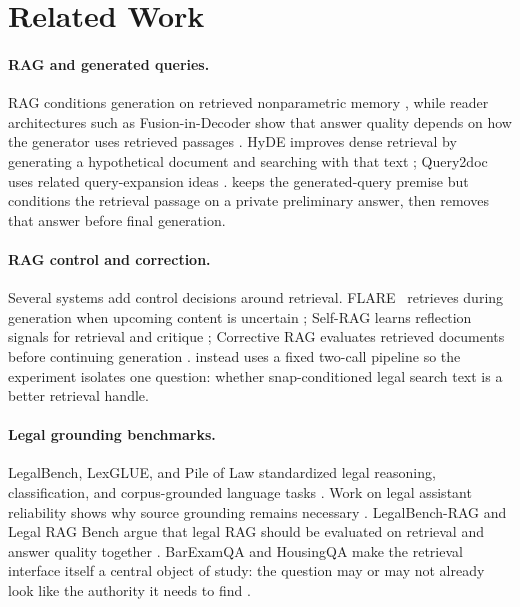 \section{Related Work}\label{sec:related_work}

\paragraph{RAG and generated queries.}
RAG conditions generation on retrieved nonparametric memory
\citep{lewis2020rag}, while reader architectures such as Fusion-in-Decoder
show that answer quality depends on how the generator uses retrieved passages
\citep{izacard2021fid}. HyDE improves dense retrieval by generating a
hypothetical document and searching with that text \citep{gao2023hyde};
Query2doc uses related query-expansion ideas \citep{wang2023query2doc}. \hyre{}
keeps the generated-query premise but conditions the retrieval passage on a
private preliminary answer, then removes that answer before final generation.

\paragraph{RAG control and correction.}
Several systems add control decisions around retrieval. FLARE~\cite{jiang2023activeretrievalaugmentedgeneration} retrieves during
generation when upcoming content is uncertain \citep{jiang2023flare};
Self-RAG learns reflection signals for retrieval and critique
\citep{asai2024selfrag}; Corrective RAG evaluates retrieved documents before
continuing generation \citep{yan2024crag}. \hyre{} instead uses a fixed
two-call pipeline so the experiment isolates one question: whether
snap-conditioned legal search text is a better retrieval handle.

\paragraph{Legal grounding benchmarks.}
LegalBench, LexGLUE, and Pile of Law standardized legal reasoning,
classification, and corpus-grounded language tasks
\citep{guha2023legalbench,chalkidis2022lexglue,henderson2022pileoflaw}.
Work on legal assistant reliability shows why source grounding remains
necessary \citep{magesh2024hallucinations}. LegalBench-RAG and Legal RAG Bench
argue that legal RAG should be evaluated on retrieval and answer quality
together \citep{pipitone2024legalbenchrag,butler2026legalragbench}. BarExamQA
and HousingQA make the retrieval interface itself a central object of study:
the question may or may not already look like the authority it needs to find
\citep{Zheng_2025}.
